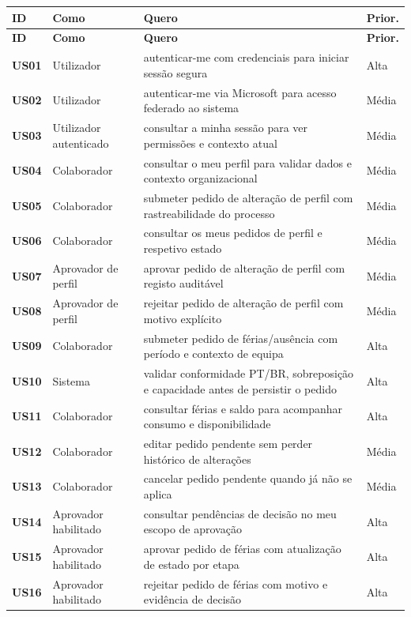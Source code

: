 \documentclass[11pt,a4paper,twoside]{article}
\newcommand{\tH}[1]{\textbf{\sffamily\small\color{white}#1}}
\newcommand{\theadrow}{\rowcolor{ACCENT}}
\begin{document}
\begin{longtable}{>{\small\centering\arraybackslash\bfseries}p{1.0cm} >{\small}p{3.7cm} >{\small}p{6.8cm} >{\small\centering\arraybackslash}p{1.6cm}}
\theadrow
\tH{ID} & \tH{Como} & \tH{Quero} & \tH{Prior.} \\
\midrule
\endfirsthead
\theadrow
\tH{ID} & \tH{Como} & \tH{Quero} & \tH{Prior.} \\
\midrule
\endhead
US01 & Utilizador & autenticar-me com credenciais para iniciar sessão segura & Alta \\
US02 & Utilizador & autenticar-me via Microsoft para acesso federado ao sistema & Média \\
US03 & Utilizador autenticado & consultar a minha sessão para ver permissões e contexto atual & Média \\
US04 & Colaborador & consultar o meu perfil para validar dados e contexto organizacional & Média \\
US05 & Colaborador & submeter pedido de alteração de perfil com rastreabilidade do processo & Média \\
US06 & Colaborador & consultar os meus pedidos de perfil e respetivo estado & Média \\
US07 & Aprovador de perfil & aprovar pedido de alteração de perfil com registo auditável & Média \\
US08 & Aprovador de perfil & rejeitar pedido de alteração de perfil com motivo explícito & Média \\
US09 & Colaborador & submeter pedido de férias/ausência com período e contexto de equipa & Alta \\
US10 & Sistema & validar conformidade PT/BR, sobreposição e capacidade antes de persistir o pedido & Alta \\
US11 & Colaborador & consultar férias e saldo para acompanhar consumo e disponibilidade & Alta \\
US12 & Colaborador & editar pedido pendente sem perder histórico de alterações & Média \\
US13 & Colaborador & cancelar pedido pendente quando já não se aplica & Média \\
US14 & Aprovador habilitado & consultar pendências de decisão no meu escopo de aprovação & Alta \\
US15 & Aprovador habilitado & aprovar pedido de férias com atualização de estado por etapa & Alta \\
US16 & Aprovador habilitado & rejeitar pedido de férias com motivo e evidência de decisão & Alta \\

\end{longtable}
\end{document}
